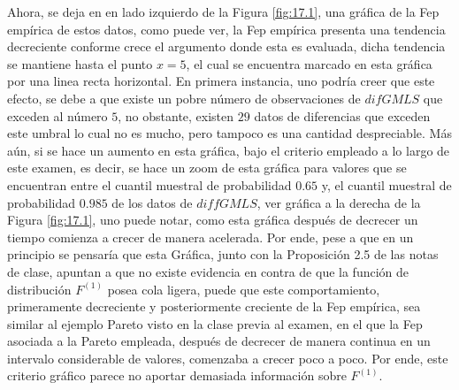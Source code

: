 \documentclass[10.5pt,notitlepage]{article}
\theoremstyle{plain}
\begin{document}
Ahora, se deja en en lado izquierdo de la Figura \ref{fig:17.1},  una gráfica de la Fep empírica de estos datos, como puede ver, la Fep empírica presenta una tendencia decreciente conforme crece el argumento donde esta es evaluada, dicha tendencia se mantiene hasta el punto \(x = 5\), el cual se encuentra marcado en esta gráfica por una linea recta horizontal. En primera instancia, uno podría creer que este efecto, se debe a que existe un pobre número de observaciones de \(difGMLS\) que exceden al número \(5\), no obstante, existen \(29\) datos de diferencias que exceden este umbral lo cual no es mucho, pero tampoco es una cantidad despreciable. Más aún, si se hace un aumento en esta gráfica, bajo el criterio empleado a lo largo de este examen, es decir, se hace un zoom de esta gráfica para valores que se encuentran entre el cuantil muestral de probabilidad \(0.65\) y, el cuantil muestral de probabilidad \(0.985\) de los datos de \(diffGMLS\), ver gráfica a la derecha de la Figura \ref{fig:17.1}, uno puede notar, como esta gráfica después de decrecer un tiempo comienza a crecer de manera acelerada. Por ende, pese a que en un principio se pensaría que esta Gráfica, junto con la Proposición 2.5 de las notas de clase, apuntan a que no existe evidencia en contra de que la función de distribución \(F^{(1)}\) posea cola ligera, puede que este comportamiento, primeramente decreciente y posteriormente creciente de la Fep empírica, sea similar al ejemplo Pareto visto en la clase previa al examen, en el que la Fep asociada a la Pareto empleada, después de decrecer de manera continua en un intervalo considerable de valores, comenzaba a crecer poco a poco. Por ende, este criterio gráfico parece no aportar demasiada información sobre \(F^{(1)}\).   
\end{document}
